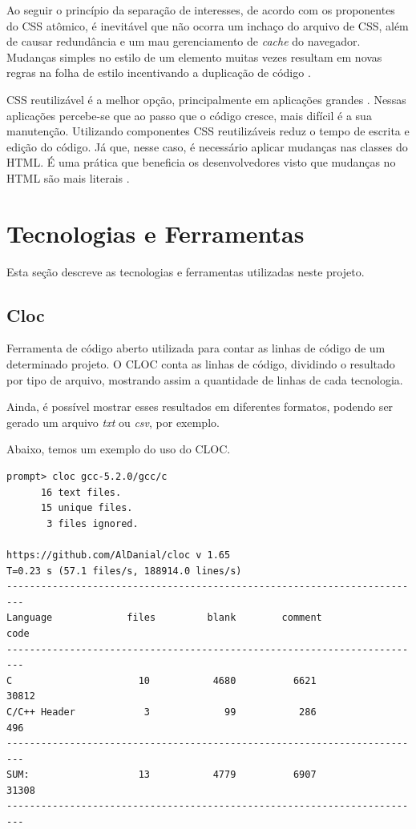 Ao seguir o princípio da separação de interesses, de acordo com os proponentes do CSS atômico, é inevitável que não ocorra um
inchaço do arquivo de CSS, além de causar redundância e um mau
gerenciamento de \emph{cache} do navegador. Mudanças simples no estilo
de um elemento muitas vezes resultam em novas regras na folha de estilo
incentivando a duplicação de código \cite{koblentz}.

CSS reutilizável é a melhor
opção, principalmente em aplicações grandes \cite{gallagher}. Nessas aplicações
percebe-se que ao passo que o código cresce, mais difícil é a sua
manutenção. Utilizando componentes CSS reutilizáveis reduz o tempo de
escrita e edição do código. Já que, nesse caso, é necessário aplicar
mudanças nas classes do HTML. É uma prática que
beneficia os desenvolvedores visto que mudanças no HTML são mais
literais \cite{gallagher}.

\newpage

\hypertarget{tecnologias-e-ferramentas}{%
\section{Tecnologias e
Ferramentas}\label{tecnologias-e-ferramentas}}

Esta seção descreve as tecnologias e ferramentas utilizadas neste projeto.

\hypertarget{cloc}{%
\subsection{Cloc}\label{cloc}}

Ferramenta de código aberto utilizada para contar as linhas de código de um determinado projeto. O CLOC conta as linhas de código, dividindo o resultado por tipo de arquivo, mostrando assim a quantidade de linhas de cada tecnologia.

Ainda, é possível mostrar esses resultados em diferentes formatos, podendo ser gerado um arquivo \emph{txt} ou \emph{csv}, por exemplo.

Abaixo, temos um exemplo do uso do CLOC.

\begin{verbatim}
prompt> cloc gcc-5.2.0/gcc/c
      16 text files.
      15 unique files.
       3 files ignored.
       
https://github.com/AlDanial/cloc v 1.65
T=0.23 s (57.1 files/s, 188914.0 lines/s)
-------------------------------------------------------------------------
Language             files         blank        comment            code
-------------------------------------------------------------------------
C                      10           4680          6621            30812
C/C++ Header            3             99           286              496
-------------------------------------------------------------------------
SUM:                   13           4779          6907            31308
-------------------------------------------------------------------------
\end{verbatim}

